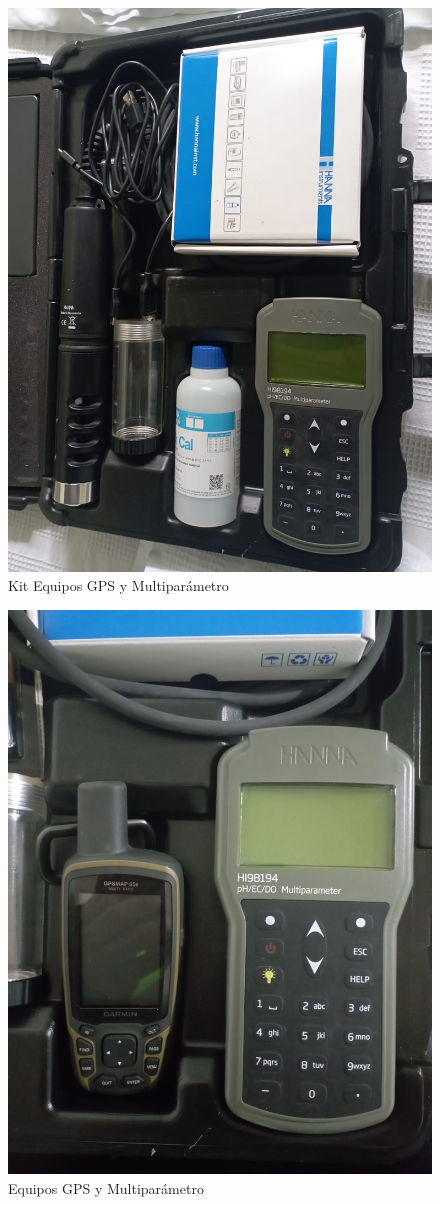 \begin{figure}
    \centering
    \includegraphics[width=0.7\linewidth]{Anexos/equipos.jpeg}
    \caption{Kit Equipos GPS y Multiparámetro}
    \label{fig:enter-label}
\end{figure}

\begin{figure}
    \centering
    \includegraphics[width=0.8\linewidth]{Anexos/duo.jpeg}
    \caption{Equipos GPS y Multiparámetro}
    \label{fig:enter-label}
\end{figure}

